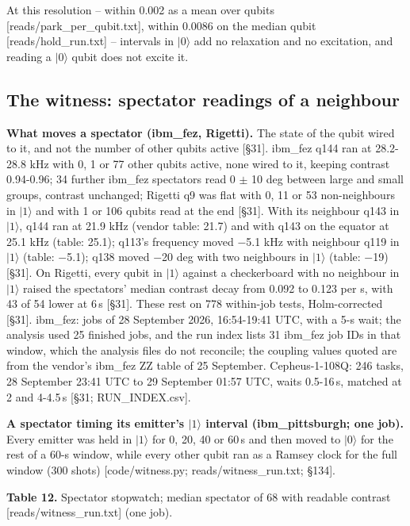 \documentclass[11pt]{article}
\begin{document}
At this resolution -- within 0.002 as a mean over qubits {[}reads/park\_per\_qubit.txt{]}, within 0.0086 on the median qubit {[}reads/hold\_run.txt{]} -- intervals in \(|0\rangle\) add no relaxation and no excitation, and reading a \(|0\rangle\) qubit does not excite it.

\subsection{The witness: spectator readings of a neighbour}
\textbf{What moves a spectator (ibm\_fez, Rigetti).} The state of the qubit wired to it, and not the number of other qubits active {[}\S{}31{]}. ibm\_fez q144 ran at 28.2-28.8 kHz with 0, 1 or 77 other qubits active, none wired to it, keeping contrast 0.94-0.96; 34 further ibm\_fez spectators read 0 \(\pm\) 10 deg between large and small groups, contrast unchanged; Rigetti q9 was flat with 0, 11 or 53 non-neighbours in \(|1\rangle\) and with 1 or 106 qubits read at the end {[}\S{}31{]}. With its neighbour q143 in \(|1\rangle\), q144 ran at 21.9 kHz (vendor table: 21.7) and with q143 on the equator at 25.1 kHz (table: 25.1); q113's frequency moved \(-\)5.1 kHz with neighbour q119 in \(|1\rangle\) (table: \(-\)5.1); q138 moved \(-\)20 deg with two neighbours in \(|1\rangle\) (table: \(-\)19) {[}\S{}31{]}. On Rigetti, every qubit in \(|1\rangle\) against a checkerboard with no neighbour in \(|1\rangle\) raised the spectators' median contrast decay from 0.092 to 0.123 per \textmu s, with 43 of 54 lower at 6\,\textmu s {[}\S{}31{]}. These rest on 778 within-job tests, Holm-corrected {[}\S{}31{]}. ibm\_fez: jobs of 28 September 2026, 16:54-19:41 UTC, with a 5-\textmu s wait; the analysis used 25 finished jobs, and the run index lists 31 ibm\_fez job IDs in that window, which the analysis files do not reconcile; the coupling values quoted are from the vendor's ibm\_fez ZZ table of 25 September. Cepheus-1-108Q: 246 tasks, 28 September 23:41 UTC to 29 September 01:57 UTC, waits 0.5-16\,\textmu s, matched at 2 and 4-4.5\,\textmu s {[}\S{}31; RUN\_INDEX.csv{]}.

\textbf{A spectator timing its emitter's \(|1\rangle\) interval (ibm\_pittsburgh; one job).} Every emitter was held in \(|1\rangle\) for 0, 20, 40 or 60\,\textmu s and then moved to \(|0\rangle\) for the rest of a 60-\textmu s window, while every other qubit ran as a Ramsey clock for the full window (300 shots) {[}code/witness.py; reads/witness\_run.txt; \S{}134{]}.

\textbf{Table 12.} Spectator stopwatch; median spectator of 68 with readable contrast {[}reads/witness\_run.txt{]} (one job).
\end{document}
